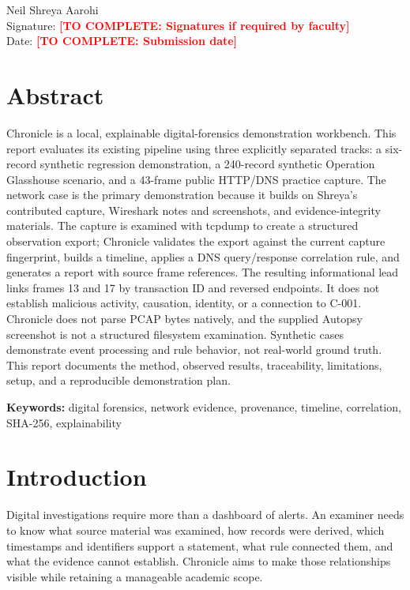 \documentclass[12pt,a4paper]{report}
\newcommand{\todo}[1]{\textcolor{red}{\textbf{[TO COMPLETE: #1]}}}
\begin{document}
\vspace{15mm}
\noindent Neil \hfill Shreya \hfill Aarohi\\[8mm]
\noindent Signature: \todo{Signatures if required by faculty}\\[5mm]
\noindent Date: \todo{Submission date}
\tableofcontents
\listoffigures
\clearpage
{}

\chapter*{Abstract}
Chronicle is a local, explainable digital-forensics demonstration workbench. This report evaluates its existing pipeline using three explicitly separated tracks: a six-record synthetic regression demonstration, a 240-record synthetic Operation Glasshouse scenario, and a 43-frame public HTTP/DNS practice capture. The network case is the primary demonstration because it builds on Shreya's contributed capture, Wireshark notes and screenshots, and evidence-integrity materials. The capture is examined with tcpdump to create a structured observation export; Chronicle validates the export against the current capture fingerprint, builds a timeline, applies a DNS query/response correlation rule, and generates a report with source frame references. The resulting informational lead links frames 13 and 17 by transaction ID and reversed endpoints. It does not establish malicious activity, causation, identity, or a connection to C-001. Chronicle does not parse PCAP bytes natively, and the supplied Autopsy screenshot is not a structured filesystem examination. Synthetic cases demonstrate event processing and rule behavior, not real-world ground truth. This report documents the method, observed results, traceability, limitations, setup, and a reproducible demonstration plan.

\noindent\textbf{Keywords:} digital forensics, network evidence, provenance, timeline, correlation, SHA-256, explainability

\chapter{Introduction}
Digital investigations require more than a dashboard of alerts. An examiner needs to know what source material was examined, how records were derived, which timestamps and identifiers support a statement, what rule connected them, and what the evidence cannot establish. Chronicle aims to make those relationships visible while retaining a manageable academic scope.
\end{document}
